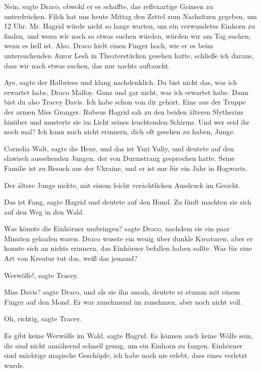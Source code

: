 \glqq{}Nein\grqq{}, sagte Draco, obwohl er es schaffte, das reflexartige Grinsen
zu unterdrücken. \glqq{}Filch hat uns heute Mittag den Zettel zum
Nachsitzen gegeben, um 12 Uhr. Mr. Hagrid würde nicht so lange warten, um
ein verwundetes Einhorn zu finden, und wenn wir nach so etwas suchen
würden, würden wir am Tag suchen, wenn es hell ist. Also\grqq{}, Draco
hielt einen Finger hoch, wie er es beim untersuchenden Auror Lesh in
Theaterstücken gesehen hatte, \glqq{}schließe ich daraus, dass wir nach
etwas suchen, das nur nachts auftaucht.\grqq{}

\glqq{}Aye\grqq{}, sagte der Halbriese und klang nachdenklich. \glqq{}Du bist
nicht das, was ich erwartet habe, Draco Malfoy. Ganz und gar nicht, was
ich erwartet habe. Dann bist du also Tracey Davis. Ich habe schon von dir
gehört. Eine aus der Truppe der armen Miss Granger.\grqq{} Rubeus Hagrid sah zu
den beiden älteren Slytherins hinüber und musterte sie im Licht seines
leuchtenden Schirms. \glqq{}Und wer seid ihr noch mal? Ich kann mich nicht
erinnern, dich oft gesehen zu haben, Junge.\grqq{}

\glqq{}Cornelia Walt\grqq{}, sagte die Hexe, \glqq{}und das ist Yuri Yuliy\grqq{},
und deutete auf den slawisch aussehenden Jungen, der von Durmstrang
gesprochen hatte. \glqq{}Seine Familie ist zu Besuch aus der Ukraine, und
er ist nur für ein Jahr in Hogwarts.\grqq{}

Der ältere Junge nickte, mit einem leicht verächtlichen Ausdruck im Gesicht.

\glqq{}Das ist Fang\grqq{}, sagte Hagrid und deutete auf den Hund. Zu fünft
machten sie sich auf den Weg in den Wald.

\glqq{}Was könnte die Einhörner umbringen?\grqq{} sagte Draco, nachdem sie ein paar
Minuten gelaufen waren. Draco wusste ein wenig über dunkle Kreaturen,
aber er konnte sich an nichts erinnern, das Einhörner befallen haben
sollte. \glqq{}Was für eine Art von Kreatur tut das, weiß das
jemand?\grqq{}

\glqq{}Werwölfe!\grqq{}, sagte Tracey.

\glqq{}Miss Davis?\grqq{} sagte Draco, und als sie ihn ansah, deutete er stumm mit
einem Finger auf den Mond. Er war zunehmend im zunehmen, aber noch nicht
voll.

\glqq{}Oh, richtig\grqq{}, sagte Tracey.

\glqq{}Es gibt keine Werwölfe im Wald\grqq{}, sagte Hagrid. \glqq{}Es können auch
keine Wölfe sein, die sind nicht annähernd schnell genug, um ein Einhorn
zu fangen. Einhörner sind mächtige magische Geschöpfe, ich habe noch nie
erlebt, dass eines verletzt wurde.\grqq{}

